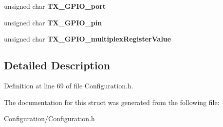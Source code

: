 \begin{DoxyCompactItemize}
\item 
unsigned char {\bfseries T\+X\+\_\+\+G\+P\+I\+O\+\_\+port}\label{struct_configuration_1_1s___u_a_r_t_config_a58cb92f787e6f31d87592fe074d44ed1}

\item 
unsigned char {\bfseries T\+X\+\_\+\+G\+P\+I\+O\+\_\+pin}\label{struct_configuration_1_1s___u_a_r_t_config_a953aa3be7a9f3e7bae5dd108c0a21bc1}

\item 
unsigned char {\bfseries T\+X\+\_\+\+G\+P\+I\+O\+\_\+multiplex\+Register\+Value}\label{struct_configuration_1_1s___u_a_r_t_config_af080173662e5be214d5c51788d06876e}

\end{DoxyCompactItemize}


\subsection{Detailed Description}


Definition at line 69 of file Configuration.\+h.



The documentation for this struct was generated from the following file\+:\begin{DoxyCompactItemize}
\item 
Configuration/Configuration.\+h\end{DoxyCompactItemize}
